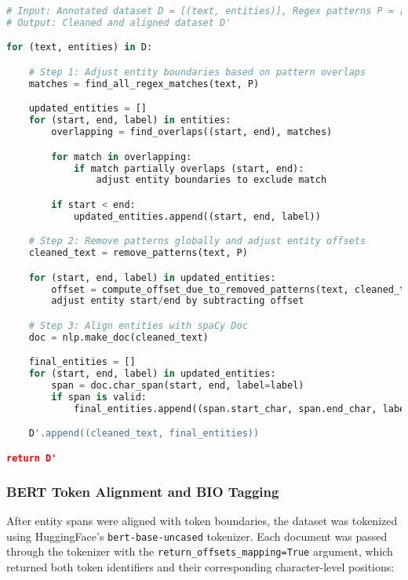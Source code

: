 \documentclass{article}
\begin{document}
\begin{lstlisting}[language=Python, caption=Entity Alignment and Cleaning Pipeline (Pseudocode)]
# Input: Annotated dataset D = [(text, entities)], Regex patterns P = [p1, p2, ...]
# Output: Cleaned and aligned dataset D'

for (text, entities) in D:

    # Step 1: Adjust entity boundaries based on pattern overlaps
    matches = find_all_regex_matches(text, P)

    updated_entities = []
    for (start, end, label) in entities:
        overlapping = find_overlaps((start, end), matches)

        for match in overlapping:
            if match partially overlaps (start, end):
                adjust entity boundaries to exclude match

        if start < end:
            updated_entities.append((start, end, label))

    # Step 2: Remove patterns globally and adjust entity offsets
    cleaned_text = remove_patterns(text, P)

    for (start, end, label) in updated_entities:
        offset = compute_offset_due_to_removed_patterns(text, cleaned_text, start)
        adjust entity start/end by subtracting offset

    # Step 3: Align entities with spaCy Doc
    doc = nlp.make_doc(cleaned_text)

    final_entities = []
    for (start, end, label) in updated_entities:
        span = doc.char_span(start, end, label=label)
        if span is valid:
            final_entities.append((span.start_char, span.end_char, label))

    D'.append((cleaned_text, final_entities))

return D'
\end{lstlisting}


\subsubsection{BERT Token Alignment and BIO Tagging}

After entity spans were aligned with token boundaries, the dataset was tokenized using HuggingFace’s \texttt{bert-base-uncased} tokenizer. Each document was passed through the tokenizer with the \texttt{return\_offsets\_mapping=True} argument, which returned both token identifiers and their corresponding character-level positions: \\
\end{document}
